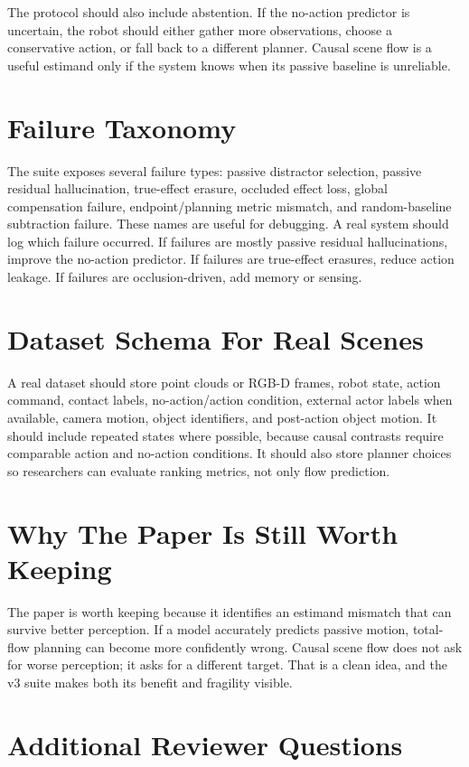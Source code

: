 \documentclass{article}
\begin{document}
The protocol should also include abstention.  If the no-action predictor is uncertain,
the robot should either gather more observations, choose a conservative action, or fall
back to a different planner.  Causal scene flow is a useful estimand only if the system
knows when its passive baseline is unreliable.

\section{Failure Taxonomy}

The suite exposes several failure types: passive distractor selection, passive residual
hallucination, true-effect erasure, occluded effect loss, global compensation failure,
endpoint/planning metric mismatch, and random-baseline subtraction failure.  These names
are useful for debugging.  A real system should log which failure occurred.  If failures
are mostly passive residual hallucinations, improve the no-action predictor.  If failures
are true-effect erasures, reduce action leakage.  If failures are occlusion-driven, add
memory or sensing.

\section{Dataset Schema For Real Scenes}

A real dataset should store point clouds or RGB-D frames, robot state, action command,
contact labels, no-action/action condition, external actor labels when available, camera
motion, object identifiers, and post-action object motion.  It should include repeated
states where possible, because causal contrasts require comparable action and no-action
conditions.  It should also store planner choices so researchers can evaluate ranking
metrics, not only flow prediction.

\section{Why The Paper Is Still Worth Keeping}

The paper is worth keeping because it identifies an estimand mismatch that can survive
better perception.  If a model accurately predicts passive motion, total-flow planning
can become more confidently wrong.  Causal scene flow does not ask for worse perception;
it asks for a different target.  That is a clean idea, and the v3 suite makes both its
benefit and fragility visible.

\section{Additional Reviewer Questions}
\end{document}
